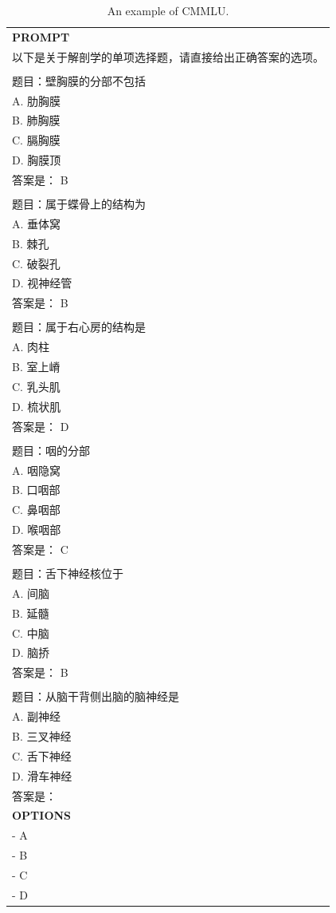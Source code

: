 \begin{table}[h]
    \centering \small
\begin{tabular}{p{12cm}}
\toprule
\textbf{PROMPT}\\
以下是关于解剖学的单项选择题，请直接给出正确答案的选项。
\\
\\题目：壁胸膜的分部不包括
\\A. 肋胸膜
\\B. 肺胸膜
\\C. 膈胸膜
\\D. 胸膜顶
\\答案是： B
\\
\\题目：属于蝶骨上的结构为
\\A. 垂体窝
\\B. 棘孔
\\C. 破裂孔
\\D. 视神经管
\\答案是： B
\\
\\题目：属于右心房的结构是
\\A. 肉柱
\\B. 室上嵴
\\C. 乳头肌
\\D. 梳状肌
\\答案是： D
\\
\\题目：咽的分部
\\A. 咽隐窝
\\B. 口咽部
\\C. 鼻咽部
\\D. 喉咽部
\\答案是： C
\\
\\题目：舌下神经核位于
\\A. 间脑
\\B. 延髓
\\C. 中脑
\\D. 脑挢
\\答案是： B
\\
\\题目：从脑干背侧出脑的脑神经是
\\A. 副神经
\\B. 三叉神经
\\C. 舌下神经
\\D. 滑车神经
\\答案是：\\
\midrule
\textbf{OPTIONS}\\
- A\\
- B\\
- C\\
- D\\
\bottomrule
\end{tabular}
    \caption{\centering An example of CMMLU.}
    \label{tab:cmmlu_eval_format_example}
\end{table}

